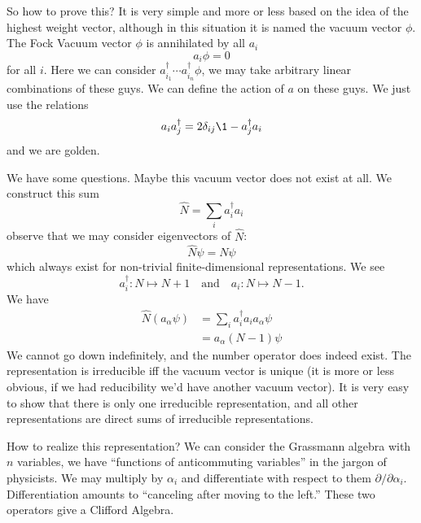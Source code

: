 So how to prove this? It is very simple and more or less based on
the idea of the highest weight vector, although in this situation
it is named the vacuum vector $\phi$. The Fock
Vacuum vector $\phi$ is annihilated by all $a_{i}$
\begin{equation}
a_{i}\phi = 0
\end{equation}
for all $i$. Here we can consider $a_{i_{1}}^{\dagger}\cdots
a_{i_{n}}^{\dagger}\phi$, we may take arbitrary linear
combinations of these guys. We can define the action of $a$ on
these guys. We just use the relations
\begin{equation}
a_{i}a_{j}^{\dagger}=2\delta_{ij}\1-a_{j}^{\dagger}a_{i}
\end{equation}
and we are golden.

We have some questions. Maybe this vacuum vector does not exist
at all. We construct this sum
\begin{equation}
\widehat{N}=\sum_{i}a_{i}^{\dagger}a_{i}
\end{equation}
observe that we may consider eigenvectors of $\widehat{N}$:
\begin{equation}
\widehat{N}\psi=N\psi
\end{equation}
which always exist for non-trivial finite-dimensional
representations. We see
\begin{equation}
a_{i}^{\dagger}\colon N\mapsto N+1 \quad\mbox{and}\quad
a_{i}\colon N\mapsto N-1.
\end{equation}
We have
\begin{subequations}
\begin{align}
\widehat{N}(a_{\alpha}\psi)
&= \sum_{i}a_{i}^{\dagger}a_{i}a_{\alpha}\psi\\
&= a_{\alpha}(N-1)\psi
\end{align}
\end{subequations}
We cannot go down indefinitely, and the number operator does
indeed exist. The representation is irreducible iff the vacuum
vector is unique (it is more or less obvious, if we had
reducibility we'd have another vacuum vector). It is very easy to
show that there is only one irreducible representation, and all
other representations are direct sums of irreducible
representations.

\begin{rmk}
How to realize this representation? We can consider the
Grassmann algebra with $n$ variables, we have ``functions of
anticommuting variables'' in the jargon of physicists. We may
multiply by $\alpha_{i}$ and differentiate with respect to them
$\partial/\partial\alpha_{i}$. Differentiation amounts to
``canceling after moving to the left.'' These two operators give
a Clifford Algebra.
\end{rmk}

